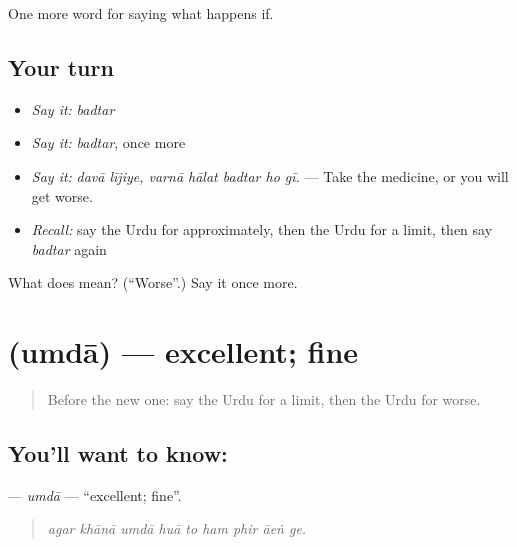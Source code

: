 \begin{grammarlens}[title={What you've built}]
One more word for saying what happens if.
\end{grammarlens}

\subsection*{Your turn}
\begin{itemize}
\raggedright
  \item \emph{Say it:} \emph{badtar}
  \item \emph{Say it:} \emph{badtar}, once more
  \item \emph{Say it:} \emph{davā lījiye, varnā hālat badtar ho gī.} — Take the medicine, or you will get worse.
  \item \emph{Recall:} say the Urdu for approximately, then the Urdu for a limit, then say \emph{badtar} again
\end{itemize}

\begin{tcolorbox}[breakable,colback=teal!4,colframe=teal!35!black,title={Before you move on}]
What does  mean? (\textquotedblleft{}Worse\textquotedblright{}.) Say it once more.
\end{tcolorbox}
\section[\texorpdfstring{\ur{عمدہ} (umdā)}{عمدہ (umdā)}]{ (umdā) — excellent; fine}

\label{lesson:UR-C377-umda}



\begin{quote}
Before the new one: say the Urdu for a limit, then the Urdu for worse.
\end{quote}

\subsection*{You'll want to know: }
\textbf{} — \emph{umdā} — \textquotedblleft{}excellent; fine\textquotedblright{}.

\begin{quote}
        
\end{quote}

\begin{quote}
\emph{agar khānā umdā huā to ham phir āeṅ ge.}
\end{quote}

